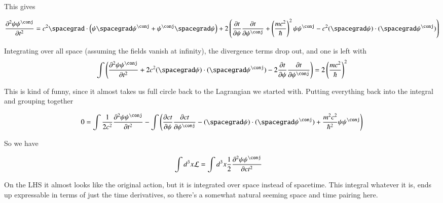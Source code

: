 \documentclass{article}
\newcommand{\PDSq}[2]{\frac{\partial^2 {#2}}{\partial {#1}^2}}
\begin{document}
This gives

\begin{align*}
\PDSq{t}{\psi\psi^\conj} 
&= 
c^2 \spacegrad \cdot \left( \psi \spacegrad \psi^\conj +\psi^\conj \spacegrad \psi \right)
+ 2 \left( 
\PD{t}{\psi}\PD{t}{\psi^\conj} + \left( \frac{m c^2}{\hbar} \right)^2 \psi \psi^\conj 
-c^2 (\spacegrad \psi) \cdot (\spacegrad \psi^\conj) 
\right)
\\
\end{align*}

Integrating over all space (assuming the fields vanish at infinity), the divergence terms drop out, and one is left with
\begin{align*}
\int \left( \PDSq{t}{\psi\psi^\conj} 
+ 2 c^2 (\spacegrad \psi) \cdot (\spacegrad \psi^\conj) 
- 2 \PD{t}{\psi}\PD{t}{\psi^\conj}  \right) 
&= 
2 \left( \frac{m c^2}{\hbar} \right)^2 
\\
\end{align*}

This is kind of funny, since it almost takes us full circle back to the Lagrangian we started with.  Putting everything 
back into the integral and grouping together 

\begin{align*}
0 &=
\int \inv{2 c^2} \PDSq{t}{\psi\psi^\conj} 
- \int 
\left(
\PD{ct}{\psi}\PD{ct}{\psi^\conj}  
- (\spacegrad \psi) \cdot (\spacegrad \psi^\conj) 
+ \frac{m^2 c^2}{\hbar^2} \psi \psi^\conj
\right)
\\
\end{align*}

So we have

\begin{align*}
\int d^3 x \LL &= \int d^3 x \inv{2} \PDSq{ct}{\psi\psi^\conj} 
\end{align*}

On the LHS it almost looks like the original action, but it is integrated over space instead of spacetime.  This integral 
whatever it is, ends up expressable in terms of just the time derivatives, so there's a somewhat natural seeming space and time
pairing here.



\end{document}
